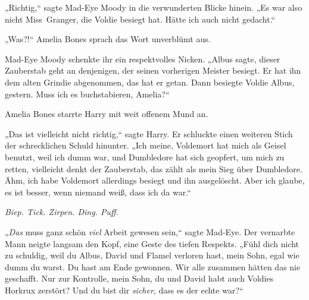 „Richtig,“ sagte Mad-Eye Moody in die verwunderten Blicke hinein. „Es war also nicht Miss~Granger, die Voldie besiegt hat. Hätte ich auch nicht gedacht.“

„Was?!“ Amelia Bones sprach das Wort unverblümt aus.

Mad-Eye Moody schenkte ihr ein respektvolles Nicken.
„Albus sagte, dieser Zauberstab geht an denjenigen, der seinen vorherigen Meister besiegt. Er hat ihn dem alten Grindie abgenommen, das hat er getan. Dann besiegte Voldie Albus, gestern. Muss ich es buchstabieren, Amelia?“

Amelia Bones starrte Harry mit weit offenem Mund an.

„Das ist vielleicht nicht richtig,“ sagte Harry. Er schluckte einen weiteren Stich der schrecklichen Schuld hinunter. „Ich meine, Voldemort hat mich als Geisel benutzt, weil ich dumm war, und Dumbledore hat sich geopfert, um mich zu retten, vielleicht denkt der Zauberstab, das zählt als mein Sieg über Dumbledore. Ähm, ich habe Voldemort allerdings besiegt und ihn ausgelöscht. Aber ich glaube, es ist besser, wenn niemand weiß, dass ich da war.“

\emph{Biep. Tick. Zirpen. Ding. Puff.}

„\emph{Das} muss ganz schön \emph{viel} Arbeit gewesen sein,“ sagte Mad-Eye. Der vernarbte Mann neigte langsam den Kopf, eine Geste des tiefen Respekts. „Fühl dich nicht zu schuldig, weil du Albus, David und Flamel verloren hast, mein Sohn, egal wie dumm du warst. Du hast am Ende gewonnen. Wir alle zusammen hätten das nie geschafft. Nur zur Kontrolle, mein Sohn, du und David habt auch Voldies Horkrux zerstört? Und du bist dir \emph{sicher}, dass es der echte war?“

